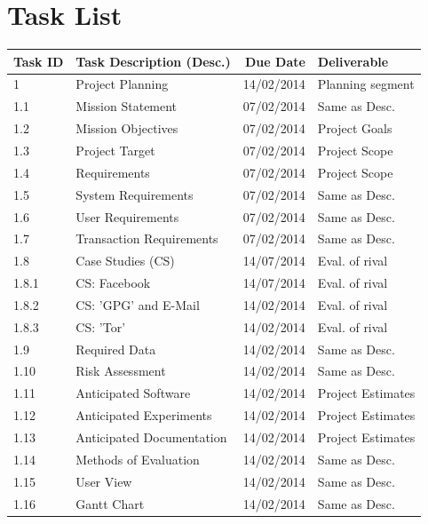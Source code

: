 \section{Task List}

\begin{tabular}{llrl}

    \toprule
    
    Task ID  & Task Description (Desc.)     & Due Date    & Deliverable       \\
    
    \midrule
    
    1        & Project Planning             & 14/02/2014  & Planning segment  \\
    1.1      & Mission Statement            & 07/02/2014  & Same as Desc.     \\
    1.2      & Mission Objectives           & 07/02/2014  & Project Goals     \\
    1.3      & Project Target               & 07/02/2014  & Project Scope     \\
    1.4      & Requirements                 & 07/02/2014  & Project Scope     \\
    1.5      & System Requirements          & 07/02/2014  & Same as Desc.     \\
    1.6      & User Requirements            & 07/02/2014  & Same as Desc.     \\
    1.7      & Transaction Requirements     & 07/02/2014  & Same as Desc.     \\
    
    \cmidrule(r){2-3}
    1.8      & Case Studies (CS)            & 14/07/2014  & Eval. of rival    \\
    1.8.1    & CS: Facebook                 & 14/07/2014  & Eval. of rival    \\
    1.8.2    & CS: 'GPG' and E-Mail         & 14/02/2014  & Eval. of rival    \\
    1.8.3    & CS: 'Tor'                    & 14/02/2014  & Eval. of rival    \\
    \cmidrule(r){2-3}
    
    1.9      & Required Data                & 14/02/2014  & Same as Desc.     \\
    1.10     & Risk Assessment              & 14/02/2014  & Same as Desc.     \\
    1.11     & Anticipated Software         & 14/02/2014  & Project Estimates \\
    1.12     & Anticipated Experiments      & 14/02/2014  & Project Estimates \\
    1.13     & Anticipated Documentation    & 14/02/2014  & Project Estimates \\
    1.14     & Methods of Evaluation        & 14/02/2014  & Same as Desc.     \\
    1.15     & User View                    & 14/02/2014  & Same as Desc.     \\
    1.16     & Gantt Chart                  & 14/02/2014  & Same as Desc.     \\
    
    \bottomrule
    
\end{tabular}


